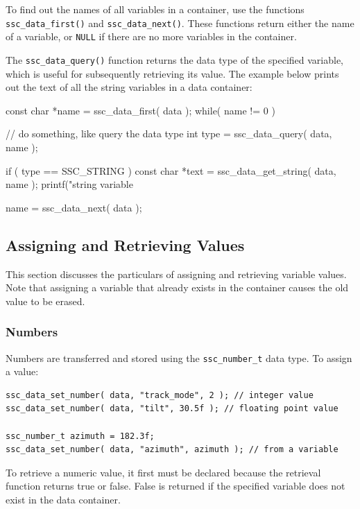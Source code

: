 \documentclass{scrartcl} %
\begin{document}
To find out the names of all variables in a container, use the functions \texttt{ssc\_data\_first()} and \texttt{ssc\_data\_next()}.  These functions return either the name of a variable, or \texttt{NULL} if there are no more variables in the container. 

The \texttt{ssc\_data\_query()} function returns the data type of the specified variable, which is useful for subsequently retrieving its value.  The example below prints out the text of all the string variables in a data container:

\begin{verbatimtab}[4]
const char *name = ssc_data_first( data );
while( name != 0 )
{
	// do something, like query the data type
	int type = ssc_data_query( data, name );

	if ( type == SSC_STRING )
	{
		const char *text = ssc_data_get_string( data, name );
		printf("string variable %
	}

	name = ssc_data_next( data );
}
\end{verbatimtab}

\subsection{Assigning and Retrieving Values}

This section discusses the particulars of assigning and retrieving variable values.  Note that assigning a variable that already exists in the container causes the old value to be erased.

\subsubsection{Numbers}

Numbers are transferred and stored using the \texttt{ssc\_number\_t} data type.  To assign a value:

\begin{verbatim}
ssc_data_set_number( data, "track_mode", 2 ); // integer value
ssc_data_set_number( data, "tilt", 30.5f ); // floating point value

ssc_number_t azimuth = 182.3f;
ssc_data_set_number( data, "azimuth", azimuth ); // from a variable
\end{verbatim}

To retrieve a numeric value, it first must be declared because the retrieval function returns true or false.  False is returned if the specified variable does not exist in the data container.
\end{document}
